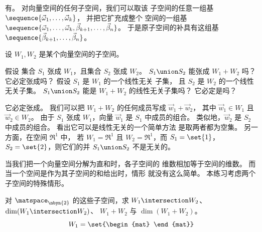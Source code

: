 \begin{exercises}
    \begin{answer}
      有。
      对向量空间的任何子空间，我们可以取该
      子空间的任意一组基 \( \sequence{\vec{\omega}_1,\dots,\vec{\omega}_k} \)，
      并把它扩充成整个
      空间的一组基
      \( \sequence{\vec{\omega}_1,\dots,\vec{\omega}_k,
                     \vec{\beta}_{k+1},\dots,\vec{\beta}_n} \)。
      于是原子空间的补具有这组基
      \( \sequence{\vec{\beta}_{k+1},\dots,\vec{\beta}_n} \)。  
     \end{answer}
  \recommended \item 
    设 \( W_1, W_2 \) 是某个向量空间的子空间。
    \begin{exparts}
      \partsitem 假设
        集合 \( S_1 \) 张成 \( W_1 \)，且集合 \( S_2 \) 张成
        \( W_2 \)。
        \( S_1\union S_2 \) 能张成 \( W_1+W_2 \) 吗？
        它必定张成吗？
      \partsitem 假设 \( S_1 \) 是 \( W_1 \) 的一个线性无关
        子集，
        且 \( S_2 \) 是 \( W_2 \) 的一个线性无关子集。
        \( S_1\union S_2 \) 能是
        \( W_1+W_2 \) 的线性无关子集吗？
        它必定是吗？
    \end{exparts}
    \begin{answer}
      \begin{exparts}
        \partsitem 它必定张成。
          我们可以把 \( W_1+W_2 \) 的任何成员写成 \( \vec{w}_1+\vec{w}_2 \)，
          其中 \( \vec{w}_1\in W_1 \) 且 \( \vec{w}_2\in W_2 \)。
          由于 \( S_1 \) 张成 \( W_1 \)，向量 \( \vec{w}_1 \) 是
          \( S_1 \) 中成员的组合。
          类似地，\( \vec{w}_2 \) 是 \( S_2 \) 中成员的组合。
        \partsitem 看出它可以是线性无关的一个简单方法
          是取两者都为空集。
          另一方面，在空间 $\Re^1$ 中，
          若 \( W_1=\Re^1 \) 且 \( W_2=\Re^1 \)，而 $S_1=\set{1}$，
          $S_2=\set{2}$，则它们的并 $S_1\union S_2$ 不是无关的。
      \end{exparts}  
     \end{answer}
  \item \label{exer:BasesSumTwoSubs}
    当我们把一个向量空间分解为直和时，各子空间的
    维数相加等于空间的维数。
    而当一个空间是作为其子空间的和给出时，情形
    就没有这么简单。
    本练习考虑两个子空间的特殊情形。
    \begin{exparts}
      \partsitem 对 \( \matspace_{\nbyn{2}} \) 的这些子空间，求
        \( W_1\intersection W_2 \)、\( \dim(W_1\intersection W_2) \)、
        \( W_1+W_2 \) 与 \( \dim(W_1+W_2) \)。
        \begin{equation*}
          W_1=\set{\begin{mat}

\end{mat}}
\end{equation*}
\end{exparts}
\end{exercises}

